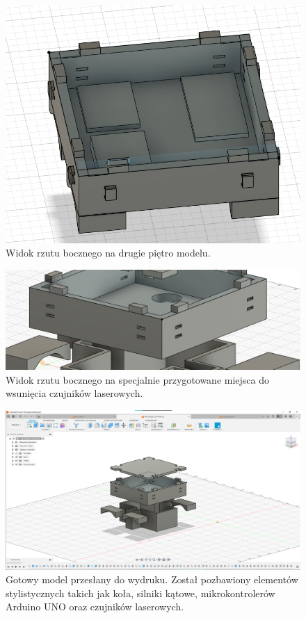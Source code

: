 \documentclass{report}
\begin{document}
\begin{figure}[htbp]
\begin{minipage}[b]{0.45\textwidth}
        \includegraphics[width=\textwidth]{"src/Robot_pics/Gora 1.png"}
        \caption{Widok rzutu bocznego na drugie piętro modelu.}
        \label{fig:zdjecie2}
    \end{minipage}
\end{figure}

\begin{figure}[H]
    \centering
    \includegraphics*[width=1.0\textwidth]{"src/Robot_pics/Fusion 3.png"}
    \caption{Widok rzutu bocznego na specjalnie przygotowane miejsca do wsunięcia czujników laserowych.}
    \label{fig:bt_con_arduino}
\end{figure}

\begin{figure}[H]
    \centering
    \includegraphics*[width=1.0\textwidth]{"src/Robot_pics/Fusion 2.png"}
    \caption{Gotowy model przesłany do wydruku. Został pozbawiony elementów stylistycznych takich jak koła, silniki kątowe, mikrokontrolerów Arduino UNO oraz czujników laserowych.} 
    \label{fig:bt_con_arduino}
\end{figure}
\end{document}
